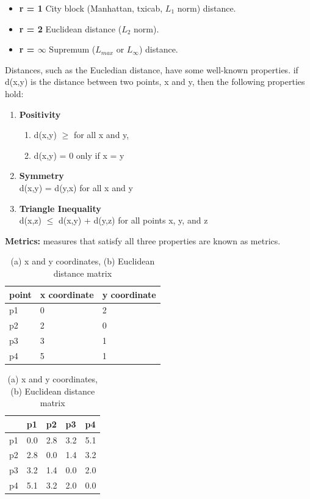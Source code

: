 	\begin{itemize}
		\item {\bf r = 1} City block (Manhattan, txicab, $L_{1}$ norm) distance.
		\item {\bf r = 2} Euclidean distance ($L_{2}$ norm).
		\item {\bf r = $\infty$} Supremum ($L_{max}$ or $L_{\infty}$) distance.
	\end{itemize}

	Distances, such as the Eucledian distance, have some well-known properties. if
	d(x,y) is the distance between two points, x and y, then the following properties
	hold:

		\begin{enumerate}
			\item {\bf Positivity}
			\begin{enumerate}
				\item d(x,y) $\geq$ for all x and y,
				\item d(x,y) = 0 only if x = y
			\end{enumerate}
			\item {\bf Symmetry} \\
				d(x,y) = d(y,x) for all x and y
			\item {\bf Triangle Inequality} \\
				d(x,z) $\leq$ d(x,y) + d(y,z) for all points x, y, and z
		\end{enumerate}

	{\bf Metrics: } measures that satisfy all three properties are known as metrics.

	\begin{table}[H]
		\centering
		\begin{tabular}{| l | l | l |}
			\hline
			point & x coordinate & y coordinate \\ \hline
			p1 & 0 & 2 \\ \hline
			p2 & 2 & 0 \\ \hline
			p3 & 3 & 1 \\ \hline
			p4 & 5 & 1 \\ \hline
		\end{tabular}
		\begin{tabular}{| l | l | l | l | l |}
			\hline
			 & p1 & p2 & p3 & p4 \\ \hline
			p1 & 0.0 & 2.8 & 3.2 & 5.1 \\ \hline
			p2 & 2.8 & 0.0 & 1.4 & 3.2 \\ \hline
			p3 & 3.2 & 1.4 & 0.0 & 2.0 \\ \hline
			p4 & 5.1 & 3.2 & 2.0 & 0.0 \\ \hline
		\end{tabular}
		\caption{(a) x and y coordinates, (b) Euclidean distance matrix}
	\end{table}

